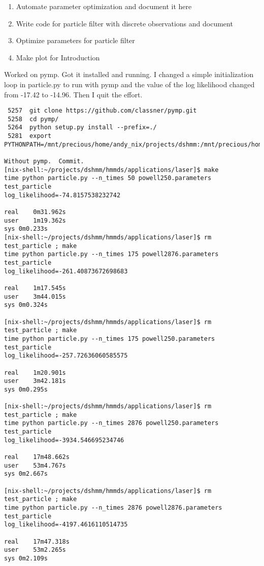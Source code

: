 \documentclass[12pt]{article}
\begin{document}
\begin{enumerate}
\item Automate parameter optimization and document it here
\item Write code for particle filter with discrete observations and document
\item Optimize parameters for particle filter
\item Make plot for Introduction
\end{enumerate}
Worked on pymp.  Got it installed and running.  I changed a simple
initialization loop in particle.py to run with pymp and the value of
the log likelihood changed from -17.42 to -14.96.  Then I quit the
effort.
\begin{verbatim}
 5257  git clone https://github.com/classner/pymp.git
 5258  cd pymp/
 5264  python setup.py install --prefix=./
 5281  export PYTHONPATH=/mnt/precious/home/andy_nix/projects/dshmm:/mnt/precious/home/andy_nix/projects/proj_hmm/src:/mnt/precious/home/andy_nix/projects/dshmm:/mnt/precious/home/andy_nix/projects/dshmm/pymp:

Without pymp.  Commit.
[nix-shell:~/projects/dshmm/hmmds/applications/laser]$ make
time python particle.py --n_times 50 powell250.parameters test_particle
log_likelihood=-74.8157538232742

real	0m31.962s
user	1m19.362s
sys	0m0.233s
[nix-shell:~/projects/dshmm/hmmds/applications/laser]$ rm test_particle ; make
time python particle.py --n_times 175 powell2876.parameters test_particle
log_likelihood=-261.40873672698683

real	1m17.545s
user	3m44.015s
sys	0m0.324s

[nix-shell:~/projects/dshmm/hmmds/applications/laser]$ rm test_particle ; make
time python particle.py --n_times 175 powell250.parameters test_particle
log_likelihood=-257.72636060585575

real	1m20.901s
user	3m42.181s
sys	0m0.295s

[nix-shell:~/projects/dshmm/hmmds/applications/laser]$ rm test_particle ; make
time python particle.py --n_times 2876 powell250.parameters test_particle
log_likelihood=-3934.546695234746

real	17m48.662s
user	53m4.767s
sys	0m2.667s

[nix-shell:~/projects/dshmm/hmmds/applications/laser]$ rm test_particle ; make
time python particle.py --n_times 2876 powell2876.parameters test_particle
log_likelihood=-4197.4616110514735

real	17m47.318s
user	53m2.265s
sys	0m2.109s


\end{verbatim}
\end{document}

